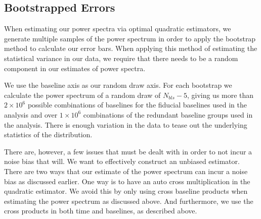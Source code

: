 \documentclass[twocolumn,numberedappendix]{emulateapj} \shorttitle{PSA64}
\begin{document}
%

\subsection{Bootstrapped Errors}\label{sec:bootstrap}
When estimating our power spectra via optimal quadratic estimators, we generate
multiple samples of the power spectrum in order to apply the bootstrap method to
calculate our error bars. When applying this method of estimating the
statistical variance in our data, we require that there needs to be a random
component in our estimates of power spectra.

We use the baseline axis as our random draw axis. For each bootstrap we
calculate the power spectrum of a random draw of $N_{bls}-5$, giving us more
than $2\times10^6$ possible combinations of baselines for the fiducial
baselines used in the analysis and over $1\times10^{6}$ combinations of the 
redundant baseline groups used in the analysis.
There is enough variation in
the data to tease out the underlying statistics of the distribution. 

There are, however, a few issues that must be dealt with in order to not incur a
noise bias that will. We want to effectively construct an unbiased estimator.
There are two ways that our estimate of the power spectrum can incur a noise
bias as discussed earlier. One way is to have an auto cross multiplication in
the quadratic estimator. We avoid this by only using cross baseline products
when estimating the power spectrum as discussed above. And furthermore, we use
the cross products in both time and baselines, as described above.
\end{document}
